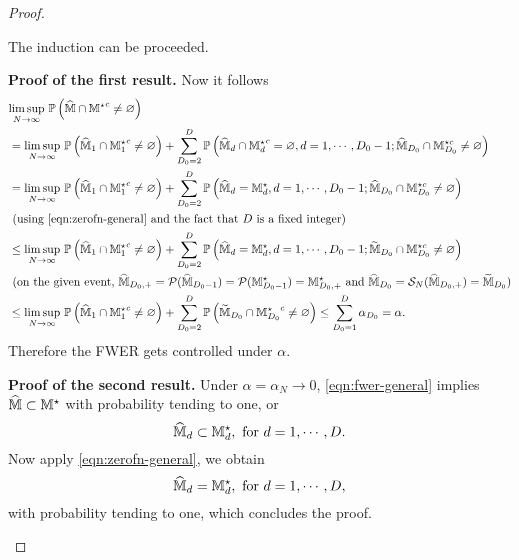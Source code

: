 \documentclass[12pt]{article}
\begin{document}
\begin{proof}
\begin{enumerate}
    The induction can be proceeded. 
    
    
    \textbf{Proof of the first result.} Now it follows
    \begingroup
    \allowdisplaybreaks
    \begin{align}
    &\underset{N\to\infty}{\lim\sup}~\bbP\left(\hat{\bbM}\cap{\bbM^\star}^c\neq\varnothing\right) \notag\\
    &= 
    \underset{N \to\infty}{\lim\sup}~\bbP\left(\hat{\bbM}_1\cap{\bbM_1^\star}^c\neq\varnothing\right) + \sum_{D_0=2}^{D} \bbP\left(\hat{\bbM}_d\cap{\bbM_d^\star}^c=\varnothing,d=1,\cdots,D_0-1; \hat{\bbM}_{D_0}\cap \bbM_{D_0}^{\star c}\neq\varnothing\right)\notag\\
    &=
    \underset{N \to\infty}{\lim\sup}~\bbP\left(\hat{\bbM}_1\cap{\bbM_1^\star}^c\neq\varnothing\right) + \sum_{D_0=2}^D \bbP\left( \hat{\bbM}_d=\bbM^\star_d,d=1,\cdots,D_0-1; \hat{\bbM}_{D_0}\cap{\bbM_{D_0}^{\star c}}\neq\varnothing\right) \notag\\
    &\see{using \eqref{eqn:zerofn-general} and the fact that $D$ is a fixed integer}\notag\\
    &\le \underset{N \to\infty}{\lim\sup}~\bbP\left(\hat{\bbM}_1\cap{\bbM_1^\star}^c\neq\varnothing\right) + \sum_{D_0=2}^D \bbP\left( \hat{\bbM}_d=\bbM^\star_d,d=1,\cdots,D_0-1; \tilde{\bbM}_{D_0}\cap\bbM_{D_0}^{\star c}\neq\varnothing\right)  \notag\\
    &\see{on the given event, $\hat{\bbM}_{D_0,+} = \cP(\hat{\bbM}_{D_0-1}) = \cP({\bbM}^\star_{D_0-1}) = {\bbM}^\star_{D_0,+}$ and $\hat{\bbM}_{D_0} = \cS_N(\hat{\bbM}_{D_0,+}) = \tilde{\bbM}_{D_0}$}\notag\\
    &\le \underset{N \to\infty}{\lim\sup}~\bbP\left(\hat{\bbM}_1\cap{\bbM_1^\star}^c\neq\varnothing\right) + \sum_{D_0=2}^D \bbP\left(  \tilde{\bbM}_{D_0}\cap{\bbM_{D_0}^\star}^c\neq\varnothing\right)
    \le \sum_{D_0=1}^D\alpha_{D_0} = \alpha. %
\end{align}
\endgroup
Therefore the FWER gets controlled under $\alpha$.

\textbf{Proof of the second result.} Under $\alpha=\alpha_N\to0$, \eqref{eqn:fwer-general} implies $\widehat{{\mathbb{M}}}\subset{\mathbb{M}}^\star$ with probability tending to one, or
\[
\widehat{{\mathbb{M}}}_d\subset{\mathbb{M}}^\star_d,  \text{ for } d=1,\cdots, D.
\]
Now apply \eqref{eqn:zerofn-general}, we obtain
\[
\widehat{{\mathbb{M}}}_d={\mathbb{M}}^\star_d,  \text{ for } d=1,\cdots, D,
\]
with probability tending to one, which concludes the proof.

\end{enumerate}

\end{proof}
\end{document}
